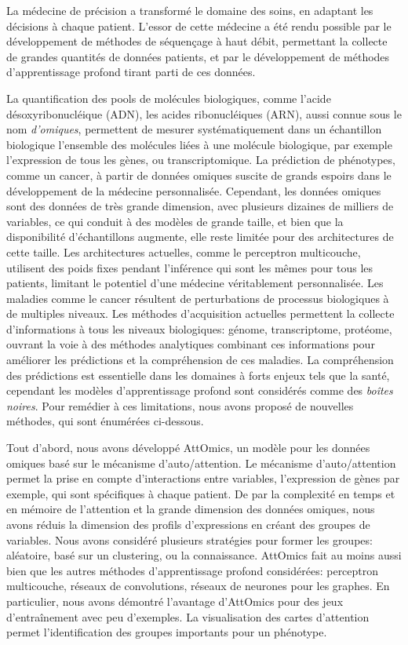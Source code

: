 La médecine de précision a transformé le domaine des soins, en adaptant les décisions à chaque patient.
L'essor de cette médecine a été rendu possible par le développement de méthodes de séquençage à haut débit, permettant la collecte de grandes quantités de données patients, et par le développement de méthodes d'apprentissage profond tirant parti de ces données.

La quantification des pools de molécules biologiques, comme l'acide désoxyribonucléique (ADN), les acides ribonucléiques (ARN), aussi connue sous le nom \textit{d'omiques}, permettent de mesurer systématiquement dans un échantillon biologique l’ensemble des molécules liées à une molécule biologique, par exemple l’expression de tous les gènes, ou transcriptomique.
La prédiction de phénotypes, comme un cancer, à partir de données omiques suscite de grands espoirs dans le développement de la médecine personnalisée.
Cependant, les données omiques sont des données de très grande dimension, avec plusieurs dizaines de milliers de variables, ce qui conduit à des modèles de grande taille, et bien que la disponibilité d'échantillons augmente, elle reste limitée pour des architectures de cette taille.
Les architectures actuelles, comme le perceptron multicouche, utilisent des poids fixes pendant l'inférence qui sont les mêmes pour tous les patients, limitant le potentiel d'une médecine véritablement personnalisée.
Les maladies comme le cancer résultent de perturbations de processus biologiques à de multiples niveaux.
Les méthodes d'acquisition actuelles permettent la collecte d'informations à tous les niveaux biologiques: génome, transcriptome, protéome, ouvrant la voie à des méthodes analytiques combinant ces informations pour améliorer les prédictions et la compréhension de ces maladies.
La compréhension des prédictions est essentielle dans les domaines à forts enjeux tels que la santé, cependant les modèles d'apprentissage profond sont considérés comme des \textit{boîtes noires}.
Pour remédier à ces limitations, nous avons proposé de nouvelles méthodes, qui sont énumérées ci-dessous.

Tout d'abord, nous avons développé AttOmics, un modèle pour les données omiques basé sur le mécanisme d'auto\-/attention.
Le mécanisme d'auto\-/attention permet la prise en compte d'interactions entre variables, l'expression de gènes par exemple, qui sont spécifiques à chaque patient.
De par la complexité en temps et en mémoire de l'attention et la grande dimension des données omiques, nous avons réduis la dimension des profils d'expressions en créant des groupes de variables.
Nous avons considéré plusieurs stratégies pour former les groupes: aléatoire, basé sur un clustering, ou la connaissance.
AttOmics fait au moins aussi bien que les autres méthodes d'apprentissage profond considérées: perceptron multicouche, réseaux de convolutions, réseaux de neurones pour les graphes.
En particulier, nous avons démontré l'avantage d'AttOmics pour des jeux d'entraînement avec peu d'exemples.
La visualisation des cartes d'attention permet l'identification des groupes importants pour un phénotype.

